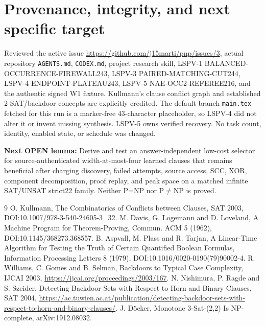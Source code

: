 \documentclass[10pt]{article}
\begin{document}
\section*{Provenance, integrity, and next specific target}
Reviewed the active issue \url{https://github.com/j15marti/pnp/issues/3}, actual repository \texttt{AGENTS.md}, \texttt{CODEX.md}, project research skill, LSPV-1 BALANCED-OCCURRENCE-FIREWALL243, LSPV-3 PAIRED-MATCHING-CUT244, LSPV-4 ENDPOINT-PLATEAU243, LSPV-5 NAE-OCC2-REFEREE216, and the authentic signed W1 fixture. Kullmann's clause conflict graph and established 2-SAT/backdoor concepts are explicitly credited. The default-branch \texttt{main.tex} fetched for this run is a marker-free 43-character placeholder, so LSPV-4 did not alter it or invent missing synthesis. LSPV-5 owns verified recovery. No task count, identity, enabled state, or schedule was changed.

\noindent\textbf{Next OPEN lemma:} Derive and test an answer-independent low-cost selector for source-authenticated width-at-most-four learned clauses that remains beneficial after charging discovery, failed attempts, source access, SCC, XOR, component decomposition, proof replay, and peak space on a matched infinite SAT/UNSAT strict22 family. Neither P=NP nor P$\ne$NP is proved.

\begin{thebibliography}{9}\small
{} O. Kullmann, The Combinatorics of Conflicts between Clauses, SAT 2003, DOI:10.1007/978-3-540-24605-3\_32.
 M. Davis, G. Logemann and D. Loveland, A Machine Program for Theorem-Proving, Commun. ACM 5 (1962), DOI:10.1145/368273.368557.
 B. Aspvall, M. Plass and R. Tarjan, A Linear-Time Algorithm for Testing the Truth of Certain Quantified Boolean Formulas, Information Processing Letters 8 (1979), DOI:10.1016/0020-0190(79)90002-4.
 R. Williams, C. Gomes and B. Selman, Backdoors to Typical Case Complexity, IJCAI 2003, \url{https://ijcai.org/proceedings/2003/167}.
 N. Nishimura, P. Ragde and S. Szeider, Detecting Backdoor Sets with Respect to Horn and Binary Clauses, SAT 2004, \url{https://ac.tuwien.ac.at/publication/detecting-backdoor-sets-with-respect-to-horn-and-binary-clauses/}.
 J. D\"ocker, Monotone 3-Sat-(2,2) Is NP-complete, arXiv:1912.08032.
\end{thebibliography}
\end{document}
